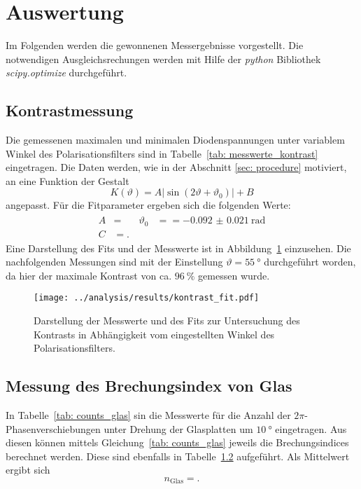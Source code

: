 \newpage
\section{Auswertung}
Im Folgenden werden die gewonnenen Messergebnisse vorgestellt. Die notwendigen Ausgleichsrechungen werden 
mit Hilfe der \emph{python} Bibliothek \emph{scipy.optimize} durchgeführt.

\subsection{Kontrastmessung}
Die gemessenen maximalen und minimalen Diodenspannungen unter variablem Winkel des Polarisationsfilters sind in 
Tabelle~\ref{tab: messwerte_kontrast} eingetragen.
Die Daten werden, wie in der Abschnitt \ref{sec: procedure} motiviert, an eine Funktion der Gestalt
\begin{equation}
    K(\vartheta) = A \left|\sin \left(2 \vartheta + \vartheta_0 \right)\right| + B 
\end{equation}
angepasst. Für die Fitparameter ergeben sich die folgenden Werte:
\begin{align}
    \begin{aligned}
    A &=  \quad  & \vartheta_0 &=  = \SI{-0.092(21)}{\radian} \\ 
    C &= .
    \end{aligned}
\end{align}
Eine Darstellung des Fits und der Messwerte ist in Abbildung~\ref{fig: kontrast_fit} einzusehen.
Die nachfolgenden Messungen sind mit der Einstellung $\vartheta = \SI{55}{\degree}$ durchgeführt worden, da hier der maximale 
Kontrast von ca. $\SI{96}{\percent}$ gemessen wurde.  



\begin{figure}[h]
    \centering
    \texttt{[image: ../analysis/results/kontrast\_fit.pdf]}
    \label{fig: kontrast_fit}
    \caption{Darstellung der Messwerte und des Fits zur Untersuchung des Kontrasts in Abhängigkeit vom eingestellten Winkel des Polarisationsfilters.}
\end{figure}


\subsection{Messung des Brechungsindex von Glas}
In Tabelle~\ref{tab: counts_glas} sin die Messwerte für die Anzahl der $2\pi$-Phasenverschiebungen unter Drehung der Glasplatten um $\SI{10}{\degree}$
eingetragen. Aus diesen können mittels Gleichung~\eqref{tab: counts_glas} jeweils die Brechungsindices berechnet werden. Diese sind ebenfalls in Tabelle~\ref{}  
aufgeführt. Als Mittelwert ergibt sich 
\begin{equation}
    n_{\text{Glas}} = .
\end{equation}

